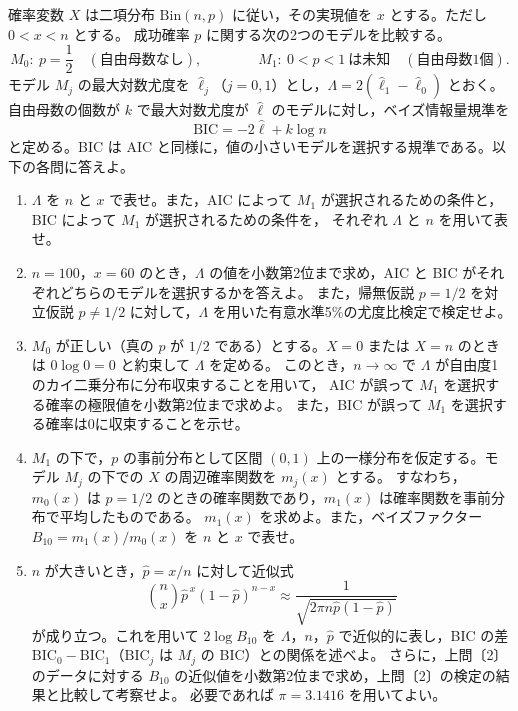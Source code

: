 \documentclass[a4paper,11pt]{ltjsarticle}
\begin{document}
確率変数 $X$ は二項分布 $\mathrm{Bin}(n,p)$ に従い，その実現値を $x$ とする。ただし $0<x<n$ とする。
成功確率 $p$ に関する次の2つのモデルを比較する。
\[
M_0:\ p=\frac12\quad(\text{自由母数なし}),\qquad\qquad
M_1:\ 0<p<1\ \text{は未知}\quad(\text{自由母数1個}).
\]
モデル $M_j$ の最大対数尤度を $\hat\ell_j$（$j=0,1$）とし，$\Lambda=2(\hat\ell_1-\hat\ell_0)$ とおく。
自由母数の個数が $k$ で最大対数尤度が $\hat\ell$ のモデルに対し，ベイズ情報量規準を
\[
\mathrm{BIC}=-2\hat\ell+k\log n
\]
と定める。BIC は AIC と同様に，値の小さいモデルを選択する規準である。以下の各問に答えよ。
\begin{enumerate}
\item $\Lambda$ を $n$ と $x$ で表せ。また，AIC によって $M_1$ が選択されるための条件と，BIC によって $M_1$ が選択されるための条件を，
それぞれ $\Lambda$ と $n$ を用いて表せ。
\item $n=100$，$x=60$ のとき，$\Lambda$ の値を小数第2位まで求め，AIC と BIC がそれぞれどちらのモデルを選択するかを答えよ。
また，帰無仮説 $p=1/2$ を対立仮説 $p\ne1/2$ に対して，$\Lambda$ を用いた有意水準5\%の尤度比検定で検定せよ。
\item $M_0$ が正しい（真の $p$ が $1/2$ である）とする。$X=0$ または $X=n$ のときは $0\log0=0$ と約束して $\Lambda$ を定める。
このとき，$n\to\infty$ で $\Lambda$ が自由度1のカイ二乗分布に分布収束することを用いて，
AIC が誤って $M_1$ を選択する確率の極限値を小数第2位まで求めよ。
また，BIC が誤って $M_1$ を選択する確率は0に収束することを示せ。
\item $M_1$ の下で，$p$ の事前分布として区間 $(0,1)$ 上の一様分布を仮定する。モデル $M_j$ の下での $X$ の周辺確率関数を $m_j(x)$ とする。
すなわち，$m_0(x)$ は $p=1/2$ のときの確率関数であり，$m_1(x)$ は確率関数を事前分布で平均したものである。
$m_1(x)$ を求めよ。また，ベイズファクター $B_{10}=m_1(x)/m_0(x)$ を $n$ と $x$ で表せ。
\item $n$ が大きいとき，$\hat p=x/n$ に対して近似式
\[
\binom nx\hat p^{\,x}(1-\hat p)^{n-x}\approx\frac{1}{\sqrt{2\pi n\hat p(1-\hat p)}}
\]
が成り立つ。これを用いて $2\log B_{10}$ を $\Lambda$，$n$，$\hat p$ で近似的に表し，BIC の差 $\mathrm{BIC}_0-\mathrm{BIC}_1$（$\mathrm{BIC}_j$ は $M_j$ の BIC）との関係を述べよ。
さらに，上問〔2〕のデータに対する $B_{10}$ の近似値を小数第2位まで求め，上問〔2〕の検定の結果と比較して考察せよ。
必要であれば $\pi=3.1416$ を用いてよい。
\end{enumerate}
\newpage
\end{document}
